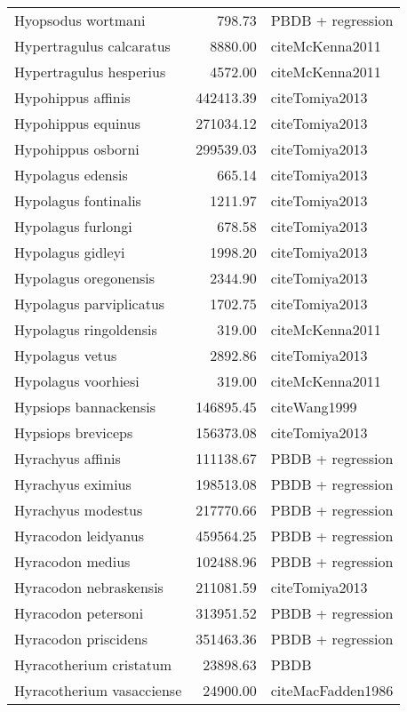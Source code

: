 \begin{table}[ht]
\begin{tabular}{lrl}
  Hyopsodus wortmani & 798.73 & PBDB + regression \\ 
  Hypertragulus calcaratus & 8880.00 & cite{McKenna2011} \\ 
  Hypertragulus hesperius & 4572.00 & cite{McKenna2011} \\ 
  Hypohippus affinis & 442413.39 & cite{Tomiya2013} \\ 
  Hypohippus equinus & 271034.12 & cite{Tomiya2013} \\ 
  Hypohippus osborni & 299539.03 & cite{Tomiya2013} \\ 
  Hypolagus edensis & 665.14 & cite{Tomiya2013} \\ 
  Hypolagus fontinalis & 1211.97 & cite{Tomiya2013} \\ 
  Hypolagus furlongi & 678.58 & cite{Tomiya2013} \\ 
  Hypolagus gidleyi & 1998.20 & cite{Tomiya2013} \\ 
  Hypolagus oregonensis & 2344.90 & cite{Tomiya2013} \\ 
  Hypolagus parviplicatus & 1702.75 & cite{Tomiya2013} \\ 
  Hypolagus ringoldensis & 319.00 & cite{McKenna2011} \\ 
  Hypolagus vetus & 2892.86 & cite{Tomiya2013} \\ 
  Hypolagus voorhiesi & 319.00 & cite{McKenna2011} \\ 
  Hypsiops bannackensis & 146895.45 & cite{Wang1999} \\ 
  Hypsiops breviceps & 156373.08 & cite{Tomiya2013} \\ 
  Hyrachyus affinis & 111138.67 & PBDB + regression \\ 
  Hyrachyus eximius & 198513.08 & PBDB + regression \\ 
  Hyrachyus modestus & 217770.66 & PBDB + regression \\ 
  Hyracodon leidyanus & 459564.25 & PBDB + regression \\ 
  Hyracodon medius & 102488.96 & PBDB + regression \\ 
  Hyracodon nebraskensis & 211081.59 & cite{Tomiya2013} \\ 
  Hyracodon petersoni & 313951.52 & PBDB + regression \\ 
  Hyracodon priscidens & 351463.36 & PBDB + regression \\ 
  Hyracotherium cristatum & 23898.63 & PBDB \\ 
  Hyracotherium vasacciense & 24900.00 & cite{MacFadden1986} \\ 

\end{tabular}
\end{table}
